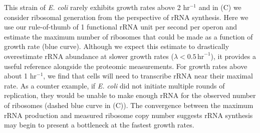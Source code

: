 This strain of \textit{E. coli} rarely exhibits growth rates above 2 hr$^{-1}$
\citep{bremer2008,roller2016} and in  (C) we consider
ribosomal generation from the perspective of rRNA synthesis. Here we use our
rule-of-thumb of 1 functional rRNA unit per second per operon and estimate the
maximum number of ribosomes that could  be made as a function of growth rate
(blue curve).  Although we expect this estimate to drastically overestimate rRNA
abundance at slower growth rates ($\lambda < 0.5\, \text{hr}^{-1}$), it provides
a useful reference alongside the proteomic measurements. For growth rates above
about 1 hr$^{-1}$, we find that cells will need to transcribe rRNA near their
maximal rate. As a counter example, if \textit{E. coli} did not initiate
multiple rounds of replication, they would be unable to make enough rRNA for the
observed number of ribosomes (dashed blue curve in (C)). The
convergence between the maximum rRNA production and measured ribosome copy
number suggests rRNA synthesis may begin to present a bottleneck at the fastest
growth rates.
